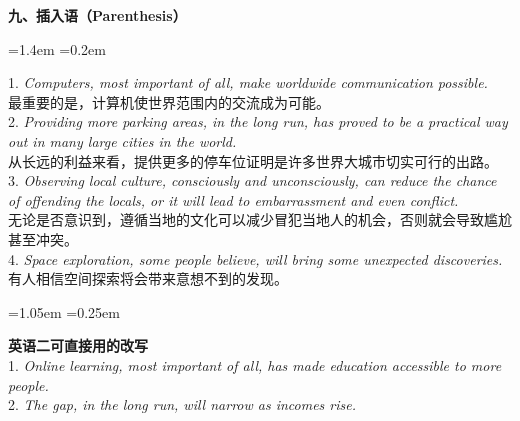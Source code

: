 \documentclass[11pt,a4paper]{ctexart}
\newcommand{\en}[1]{\textit{#1}}
\newenvironment{note}{%
  \par\addvspace{5pt}%
  \begin{list}{}{\leftmargin=1.05em \rightmargin=0.25em \listparindent=0pt
    \itemindent=0pt \topsep=0pt \parsep=2pt \itemsep=2pt \partopsep=0pt}%
  \item\relax\small\color{ink}%
}{%
  \end{list}\addvspace{5pt}%
}
\newenvironment{eg}{%
  \par\addvspace{4pt}%
  \begin{list}{}{\leftmargin=1.4em \rightmargin=0.2em \listparindent=0pt
    \itemindent=0pt \topsep=0pt \parsep=2pt \itemsep=2pt \partopsep=0pt}%
  \item\relax
}{%
  \end{list}\addvspace{5pt}%
}
\begin{document}
\par\addvspace{6pt}\noindent\textbf{九、插入语（Parenthesis）}\par\addvspace{2pt}
\begin{eg}
1. \en{Computers, most important of all, make worldwide communication possible.}\\
最重要的是，计算机使世界范围内的交流成为可能。\\
2. \en{Providing more parking areas, in the long run, has proved to be a practical way out in many large cities in the world.}\\
从长远的利益来看，提供更多的停车位证明是许多世界大城市切实可行的出路。\\
3. \en{Observing local culture, consciously and unconsciously, can reduce the chance of offending the locals, or it will lead to embarrassment and even conflict.}\\
无论是否意识到，遵循当地的文化可以减少冒犯当地人的机会，否则就会导致尴尬甚至冲突。\\
4. \en{Space exploration, some people believe, will bring some unexpected discoveries.}\\
有人相信空间探索将会带来意想不到的发现。\\
\end{eg}
\begin{note}
\textbf{英语二可直接用的改写}\\
1. \en{Online learning, most important of all, has made education accessible to more people.}\\
2. \en{The gap, in the long run, will narrow as incomes rise.}
\end{note}
\end{document}
